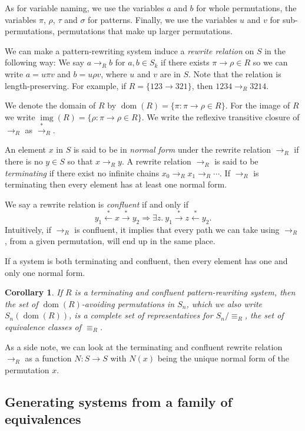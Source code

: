 \documentclass[a4paper, 11pt, english]{article}
\newcommand{\patternrule}{ \to \!}
\newtheorem{corollary}[theorem]{Corollary}
\theoremstyle{definition}
\newcommand{\Sym}{S}
\newcommand{\from}{\leftarrow}
\newcommand{\tostar}{\stackrel{*}{\to}}
\newcommand{\fromstar}{\stackrel{*}{\from}}
\DeclareMathOperator{\dom}{dom}
\DeclareMathOperator{\img}{img}
\begin{document}
As for variable naming, we use the variables $a$ and $b$ for whole permutations, 
the variables $\pi$, $\rho$, $\tau$ and $\sigma$ for patterns.
Finally, we use the variables $u$ and $v$ for sub-permutations, permutations that make up larger
permutations.

We can make a pattern-rewriting system induce a \emph{rewrite relation} on $\Sym$ in the following way: We say
$a \to_R b$ for $a, b \in \Sym_k$ if there exists $\pi \patternrule \rho \in R$ so
we can write $a = u \pi v$ and $b = u \rho v$, where
$u$ and $v$ are in $\Sym$. Note that the relation is
length-preserving. For example, if $R = \{123 \patternrule 321\}$, then $1234 \to_R 3214$. 

We denote the domain of $R$ by $\dom(R) = \{\pi : \pi \patternrule
\rho \in R\}$. For the image of $R$ we write $\img(R) = \{\rho : \pi
\patternrule \rho \in R\}$. We write the reflexive transitive closure of
$\to_R$ as $\tostar_R$. 

An element $x$ in $\Sym$ is said to be in \emph{normal form} under the rewrite relation $\to_R$
if there is no $y \in \Sym$ so that $x \to_R y$. A rewrite relation $\to_R$ is said to be
\emph{terminating} if there exist no infinite chains $x_0 \to_R x_1 \to_R \cdots$. If
$\to_R$ is terminating then every element has at least one normal form. 

We say a rewrite relation is \emph{confluent} if and only if
$$
    y_1 \fromstar x \tostar y_2 \Longrightarrow 
    \exists z. \  y_1 \tostar z \fromstar y_2.
$$
Intuitively, if $\to_R$ is confluent, it implies that every path we can
take using $\to_R$, from a given permutation, will end up in the same place. 

If a system is both terminating and confluent, then every element has one and
only one normal form.

\begin{corollary}
    If $R$ is a terminating and confluent pattern-rewriting system, then the set of
    $\dom(R)$-avoiding permutations in $S_n$, which we also write $S_n(\dom(R))$, is a complete set of
    representatives for $S_n / \equiv_R$, the set of equivalence classes of $\equiv_R$.
\end{corollary}

As a side note, we can look at the terminating and confluent rewrite relation $\to_R$ as a function 
$N : \Sym \to \Sym$ with $N(x)$ being the unique normal form of the permutation $x$.

\subsection{Generating systems from a family of equivalences}
\end{document}
